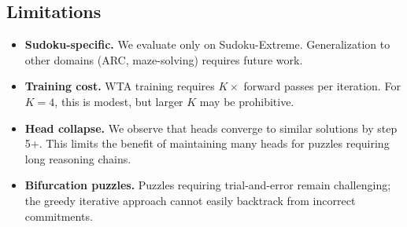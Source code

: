 \subsection{Limitations}

\begin{itemize}
  \item \textbf{Sudoku-specific.} We evaluate only on Sudoku-Extreme.
    Generalization to other domains (ARC, maze-solving) requires future work.
  \item \textbf{Training cost.} WTA training requires $K\times$ forward passes
    per iteration. For $K{=}4$, this is modest, but larger $K$ may be
    prohibitive.
  \item \textbf{Head collapse.} We observe that heads converge to similar
    solutions by step 5+. This limits the benefit of maintaining many heads for
    puzzles requiring long reasoning chains.
  \item \textbf{Bifurcation puzzles.} Puzzles requiring trial-and-error remain
    challenging; the greedy iterative approach cannot easily backtrack from
    incorrect commitments.
\end{itemize}
